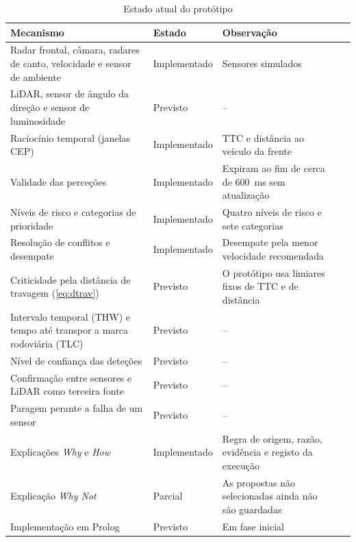 \begin{table}[H]
  \centering
  \caption{Estado atual do protótipo}
  \label{tab:estado-prototipo}
  \small
  \begin{tabularx}{\textwidth}{@{}>{\raggedright\arraybackslash}XV
      L{2.3cm}VL{6.2cm}@{}}
    \toprule
    \textbf{Mecanismo} & \textbf{Estado} & \textbf{Observação} \\
    \midrule
    Radar frontal, câmara, radares de canto, velocidade e sensor de ambiente
      & Implementado & Sensores simulados \\ \linhasep
    LiDAR, sensor de ângulo da direção e sensor de luminosidade
      & Previsto & -- \\ \linhasep
    Raciocínio temporal (janelas CEP)
      & Implementado & TTC e distância ao veículo da frente \\ \linhasep
    Validade das perceções
      & Implementado & Expiram ao fim de cerca de 600~ms sem atualização \\ \linhasep
    Níveis de risco e categorias de prioridade
      & Implementado & Quatro níveis de risco e sete categorias \\ \linhasep
    Resolução de conflitos e desempate
      & Implementado & Desempate pela menor velocidade recomendada \\ \linhasep
    Criticidade pela distância de travagem (\cref{eq:dtrav})
      & Previsto & O protótipo usa limiares fixos de TTC e de distância \\ \linhasep
    Intervalo temporal (THW) e tempo até transpor a marca rodoviária (TLC)
      & Previsto & -- \\ \linhasep
    Nível de confiança das deteções
      & Previsto & -- \\ \linhasep
    Confirmação entre sensores e LiDAR como terceira fonte
      & Previsto & -- \\ \linhasep
    Paragem perante a falha de um sensor
      & Previsto & -- \\ \linhasep
    Explicações \emph{Why} e \emph{How}
      & Implementado & Regra de origem, razão, evidência e registo da
        execução \\ \linhasep
    Explicação \emph{Why Not}
      & Parcial & As propostas não selecionadas ainda não são guardadas \\ \linhasep
    Implementação em Prolog
      & Previsto & Em fase inicial \\
    \bottomrule
  \end{tabularx}
\end{table}
